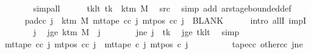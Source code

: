 \begin{isabellebody}
\ \ \ \ \ \ \isamarkupfalse%
\ simp{\isacharunderscore}{\kern0pt}all\isanewline
\ \ \ \ \isamarkupfalse%
\ tk{\isacharunderscore}{\kern0pt}lt{\isacharcolon}{\kern0pt}\ {\isachardoublequoteopen}tk\ {\isacharless}{\kern0pt}\ k{\isacharunderscore}{\kern0pt}tm\ M{\isachardoublequoteclose}\ \isamarkupfalse%
\ src{}\ \isamarkupfalse%
\ {\isacharparenleft}{\kern0pt}simp\ add{\isacharcolon}{\kern0pt}\ ar{\isacharunderscore}{\kern0pt}stage{\isacharunderscore}{\kern0pt}bounded{\isacharunderscore}{\kern0pt}def{\isacharparenright}{\kern0pt}\isanewline
\ \ \ \ \isamarkupfalse%
\ pad{\isacharunderscore}{\kern0pt}cc{\isacharcolon}{\kern0pt}\ {\isachardoublequoteopen}{\isasymforall}j{\isacharprime}{\kern0pt}\ {\isasymge}\ k{\isacharunderscore}{\kern0pt}tm\ M{\isachardot}{\kern0pt}\ mt{\isacharunderscore}{\kern0pt}tape\ cc\ j{\isacharprime}{\kern0pt}\ {\isacharparenleft}{\kern0pt}mt{\isacharunderscore}{\kern0pt}pos\ cc\ j{\isacharprime}{\kern0pt}{\isacharparenright}{\kern0pt}\ {\isacharequal}{\kern0pt}\ BLANK{}{\isachardoublequoteclose}\isanewline
\ \ \ \ \isamarkupfalse%
\ {\isacharparenleft}{\kern0pt}intro\ allI\ impI{\isacharparenright}{\kern0pt}\isanewline
\ \ \ \ \ \ \isamarkupfalse%
\ j{\isacharprime}{\kern0pt}\ \isamarkupfalse%
\ jge{\isacharcolon}{\kern0pt}\ {\isachardoublequoteopen}k{\isacharunderscore}{\kern0pt}tm\ M\ {\isasymle}\ j{\isacharprime}{\kern0pt}{\isachardoublequoteclose}\isanewline
\ \ \ \ \ \ \isamarkupfalse%
\ jne{\isacharcolon}{\kern0pt}\ {\isachardoublequoteopen}j{\isacharprime}{\kern0pt}\ {\isasymnoteq}\ tk{\isachardoublequoteclose}\ \isamarkupfalse%
\ jge\ tk{\isacharunderscore}{\kern0pt}lt\ \isamarkupfalse%
\ simp\isanewline
\ \ \ \ \ \ \isamarkupfalse%
\ {\isachardoublequoteopen}mt{\isacharunderscore}{\kern0pt}tape\ cc\ j{\isacharprime}{\kern0pt}\ {\isacharparenleft}{\kern0pt}mt{\isacharunderscore}{\kern0pt}pos\ cc\ j{\isacharprime}{\kern0pt}{\isacharparenright}{\kern0pt}\ {\isacharequal}{\kern0pt}\ mt{\isacharunderscore}{\kern0pt}tape\ c{}\ j{\isacharprime}{\kern0pt}\ {\isacharparenleft}{\kern0pt}mt{\isacharunderscore}{\kern0pt}pos\ c{}\ j{\isacharprime}{\kern0pt}{\isacharparenright}{\kern0pt}{\isachardoublequoteclose}\isanewline
\ \ \ \ \ \ \ \ \isamarkupfalse%
\ tape{\isacharunderscore}{\kern0pt}cc\ other{\isacharunderscore}{\kern0pt}cc\ jne\ \isamarkupfalse%

\end{isabellebody}
